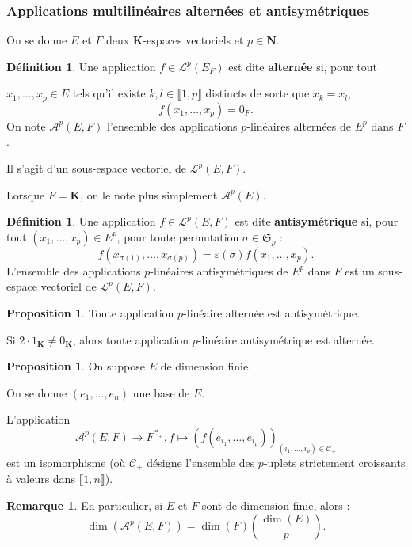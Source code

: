 \documentclass[12pt,a4paper]{article}
\theoremstyle{definition}
\newtheorem{prop}[thm]{Proposition}
\newtheorem{defn}[thm]{Définition}
\newtheorem{rqe}[thm]{Remarque}
\begin{document}
\subsubsection{Applications multilinéaires alternées et antisymétriques}
On se donne $E$ et $F$ deux $\mathbf{K}$-espaces vectoriels et $p\in\mathbf{N}$.
\begin{defn}
Une application $f\in\mathcal{L}^p(E_F)$ est dite \textbf{alternée} si, pour tout

$x_1,\ldots,x_p\in E$ tels qu'il existe $k,l\in\llbracket 1,p\rrbracket$ distincts de sorte que $x_k=x_l$,
$$f(x_1,\ldots,x_p)=0_F.$$
On note $\mathcal{A}^p(E,F)$ l'ensemble des applications $p$-linéaires alternées de $E^p$ dans $F$.

Il s'agit d'un sous-espace vectoriel de $\mathcal{L}^p(E,F)$.

Lorsque $F=\mathbf{K}$, on le note plus simplement $\mathcal{A}^p(E)$.
\end{defn}
\begin{defn}
Une application $f\in\mathcal{L}^p(E,F)$ est dite \textbf{antisymétrique} si, pour tout $(x_1,\ldots,x_p)\in E^p$, pour toute permutation $\sigma\in\mathfrak{S}_p$ :
$$
f\left(x_{\sigma(1)},\ldots,x_{\sigma(p)}\right)=\varepsilon(\sigma)f(x_1,\ldots,x_p).
$$
L'ensemble des applications $p$-linéaires antisymétriques de $E^p$ dans $F$ est un sous-espace vectoriel de $\mathcal{L}^p(E,F)$.
\end{defn}
\begin{prop}
Toute application $p$-linéaire alternée est antisymétrique.

Si $2\cdot 1_\mathbf{K}\neq 0_\mathbf{K}$, alors toute application $p$-linéaire antisymétrique est alternée.
\end{prop}
\begin{prop}
On suppose $E$ de dimension finie.

On se donne $(e_1,\ldots,e_n)$ une base de $E$.

L'application
$$
\mathcal{A}^p(E,F)\to F^{\mathcal{C}_+},f\mapsto\left(f\left(e_{i_1},\ldots,e_{i_p}\right)\right)_{(i_1,\ldots,i_p)\in\mathcal{C}_+}
$$
est un isomorphisme (où $\mathcal{C}_+$ désigne l'ensemble des $p$-uplets strictement croissants à valeurs dans $\llbracket 1,n\rrbracket$).
\end{prop}
\begin{rqe}
En particulier, si $E$ et $F$ sont de dimension finie, alors :
$$
\dim\left(\mathcal{A}^p(E,F)\right)=\dim(F)\binom{\dim(E)}{p}.
$$
\end{rqe}
\newpage
\end{document}
